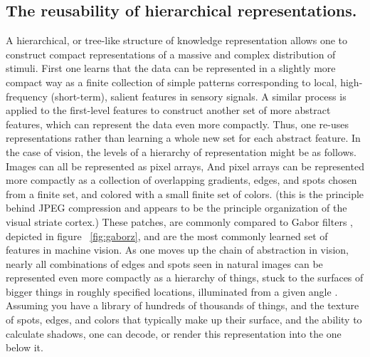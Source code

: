 \documentclass[12pt]{article}
\begin{document}
\begin{doublespacing}
	\subsection{The reusability of hierarchical representations.}
	A hierarchical, or tree-like structure of knowledge representation allows one to construct compact representations of a massive and complex distribution of stimuli. First one learns that the data can be represented in a slightly more compact way as a finite collection of simple patterns corresponding to local, high-frequency (short-term), salient features in sensory signals. A similar process is applied to the first-level features to construct another set of more abstract features, which can represent the data even more compactly. Thus, one re-uses representations rather than learning a whole new set for each abstract feature.
	In the case of vision, the levels of a hierarchy of representation might be as follows. Images can all be represented as pixel arrays, And pixel arrays can be represented more compactly as a collection of overlapping gradients, edges, and spots chosen from a finite set, and colored with a small finite set of colors. (this is the principle behind JPEG compression and appears to be the principle organization of the visual striate cortex.) These patches, are commonly compared to Gabor filters %
, depicted in figure ~\ref{fig:gaborz}, and are the most commonly learned set of features in machine vision. As one moves up the chain of abstraction in vision, nearly all combinations of edges and spots seen in natural images can be represented even more compactly as a hierarchy of things, stuck to the surfaces of bigger things in roughly specified locations, illuminated from a given angle \cite{gluckman2003kurtosis}. Assuming you have a library of hundreds of thousands of things, and the texture of spots, edges, and colors that typically make up their surface, and the ability to calculate shadows, one can decode, or render this representation into the one below it.


\end{doublespacing}
\end{document}
